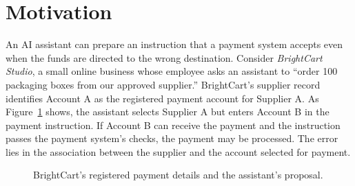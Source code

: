 




\section{Motivation}
\label{sec:motivation}

An AI assistant can prepare an instruction that a payment system accepts
even when the funds are directed to the wrong destination. Consider
\textit{BrightCart Studio}, a small online business whose employee asks
an assistant to ``order 100 packaging boxes from our approved supplier.'' BrightCart's supplier record identifies Account A as the registered
payment account for Supplier A. As Figure~\ref{fig:motivation_scenario}
shows, the assistant selects Supplier A but enters Account B in the
payment instruction. If Account B can receive the payment and the
instruction passes the payment system's checks, the payment may be
processed. The error lies in the association between the supplier and
the account selected for payment.

\begin{figure}[H]
    \centering
    
    \caption{BrightCart's registered payment details and the assistant's
    proposal.}
    \label{fig:motivation_scenario}
\end{figure}

